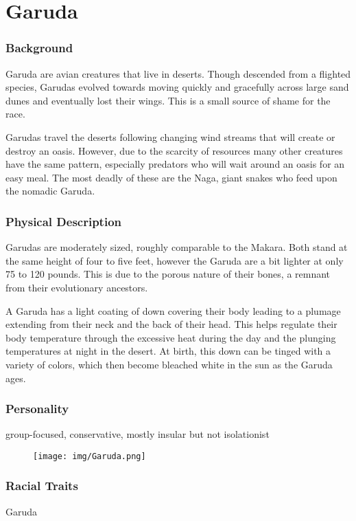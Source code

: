 \chapter*{Garuda}

\subsection*{Background}

Garuda are avian creatures that live in deserts. Though descended from a flighted species, Garudas evolved towards moving quickly and gracefully across large sand dunes and eventually lost their wings. This is a small source of shame for the race.

Garudas travel the deserts following changing wind streams that will create or destroy an oasis. However, due to the scarcity of resources many other creatures have the same pattern, especially predators who will wait around an oasis for an easy meal. The most deadly of these are the Naga, giant snakes who feed upon the nomadic Garuda.

\subsection*{Physical Description}

Garudas are moderately sized, roughly comparable to the Makara. Both stand at the same height of four to five feet, however the Garuda are a bit lighter at only 75 to 120 pounds. This is due to the porous nature of their bones, a remnant from their evolutionary ancestors.

A Garuda has a light coating of down covering their body leading to a plumage extending from their neck and the back of their head. This helps regulate their body temperature through the excessive heat during the day and the plunging temperatures at night in the desert. At birth, this down can be tinged with a variety of colors, which then become bleached white in the sun as the Garuda ages.

\subsection*{Personality}

group-focused, conservative, mostly insular but not isolationist

\newpage

\begin{figure}[ht!]
	\texttt{[image: img/Garuda.png]}
\end{figure}

\subsection*{Racial Traits}
\begin{monsterbox}{Garuda}
	\vspace{.1in}
	\hline
	\stats[
	STR = -1,
	DEX = +1,
	VIT = -1,
	FOC = +1,
	WILL = +1
	]
	\hline
\end{monsterbox}